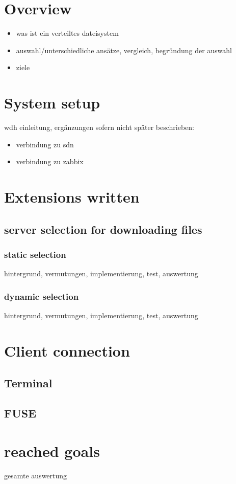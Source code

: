 
\section{Overview}

\begin{itemize}
\item was ist ein verteiltes dateisystem
\item auswahl/unterschiedliche ansätze, vergleich, begründung der auswahl
\item ziele
\end{itemize}

\section{System setup}

wdh einleitung, ergänzungen sofern nicht später beschrieben:

\begin{itemize}
\item verbindung zu sdn
\item verbindung zu zabbix
\end{itemize}

\section{Extensions written}

\subsection{server selection for downloading files}

\subsubsection{static selection}

hintergrund, vermutungen, implementierung, test, auswertung

\subsubsection{dynamic selection}

hintergrund, vermutungen, implementierung, test, auswertung

\section{Client connection}
\subsection{Terminal}
\subsection{FUSE}

\section{reached goals}
gesamte auswertung





